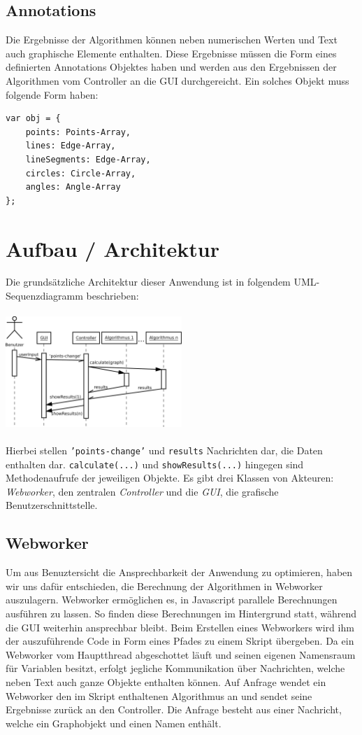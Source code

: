 \documentclass[a4paper,twocolumn]{scrartcl}
\begin{document}
\subsection{Annotations}
Die Ergebnisse der Algorithmen können neben numerischen Werten und Text auch graphische Elemente enthalten. Diese Ergebnisse müssen die Form eines definierten Annotations Objektes haben und werden aus den Ergebnissen der Algorithmen vom Controller an die GUI durchgereicht. Ein solches Objekt muss folgende Form haben:
\begin{lstlisting}
var obj = {
    points: Points-Array,
    lines: Edge-Array,
    lineSegments: Edge-Array,
    circles: Circle-Array,
    angles: Angle-Array
};
\end{lstlisting}

\section{Aufbau / Architektur}
Die grundsätzliche Architektur dieser Anwendung ist in folgendem UML-Sequenzdiagramm beschrieben:
\\\\
\includegraphics[width=0.5\textwidth]{Bilder/SequenceArchitecture}
\\\\
Hierbei stellen \texttt{'points-change'} und \texttt{results} Nachrichten dar, die Daten enthalten dar. \texttt{calculate(...)} und \texttt{showResults(...)} hingegen sind Methodenaufrufe der jeweiligen Objekte.
Es gibt drei Klassen von Akteuren: \emph{Webworker}, den zentralen \emph{Controller} und die \emph{GUI}, die grafische Benutzerschnittstelle.

\subsection{Webworker}
Um aus Benuztersicht die Ansprechbarkeit der Anwendung zu optimieren, haben wir uns dafür entschieden, die Berechnung der Algorithmen in Webworker auszulagern. Webworker ermöglichen es, in Javascript parallele Berechnungen ausführen zu lassen. So finden diese Berechnungen im Hintergrund statt, während die GUI weiterhin ansprechbar bleibt.
Beim Erstellen eines Webworkers wird ihm der auszuführende Code in Form eines Pfades zu einem Skript übergeben.
Da ein Webworker vom Hauptthread abgeschottet läuft und seinen eigenen Namensraum für Variablen besitzt, erfolgt jegliche Kommunikation über Nachrichten, welche neben Text auch ganze Objekte enthalten können.
Auf Anfrage wendet ein Webworker den im Skript enthaltenen Algorithmus an und sendet seine Ergebnisse zurück an den Controller. Die Anfrage besteht aus einer Nachricht, welche ein Graphobjekt und einen Namen enthält.
\end{document}
